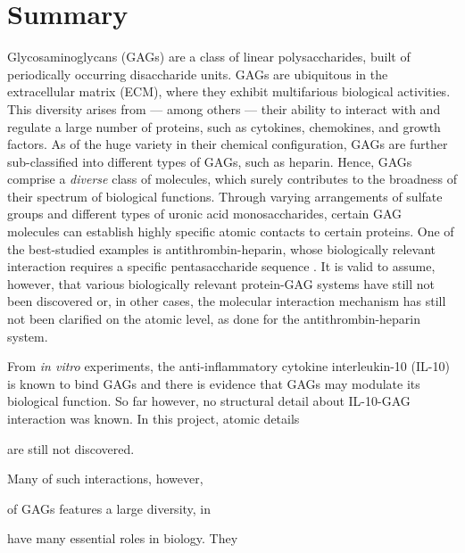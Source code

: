 \chapter{Summary}



Glycosaminoglycans (GAGs) are a class of linear polysaccharides, built of
periodically occurring disaccharide units. GAGs are ubiquitous in the
extracellular matrix (ECM), where they exhibit multifarious biological
activities. This diversity arises from --- among others --- their ability to
interact with and regulate a large number of proteins, such as cytokines,
chemokines, and growth factors. As of the huge variety in their chemical
configuration, GAGs are further sub-classified into different types of GAGs,
such as heparin. Hence, GAGs comprise a \textit{diverse} class of molecules,
which surely contributes to the broadness of their spectrum of biological
functions. Through varying arrangements of sulfate groups and different types of
uronic acid monosaccharides, certain GAG molecules can establish highly specific
atomic contacts to certain proteins. One of the best-studied examples is
antithrombin-heparin, whose biologically relevant interaction requires a
specific pentasaccharide sequence \cite{antithrombin-thrombin-heparin-2004}. It
is valid to assume, however, that various biologically relevant protein-GAG
systems have still not been discovered or, in other cases, the molecular
interaction mechanism has still not been clarified on the atomic level, as
done for the antithrombin-heparin system.


From \textit{in vitro}
experiments, the anti-inflammatory cytokine interleukin-10 (IL-10) is known to
bind GAGs and there is evidence that GAGs may modulate its biological function.
So far however, no structural detail about IL-10-GAG interaction was known. In
this project, atomic details



are still
not discovered.


Many of such interactions, however,




of GAGs features a
large diversity, in


have many essential roles in biology. They

